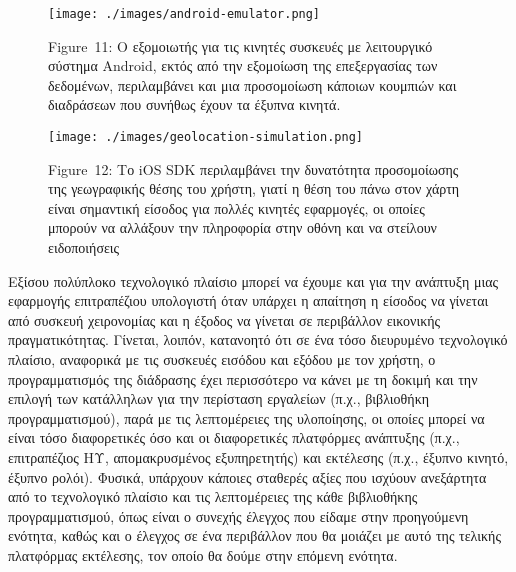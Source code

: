 \documentclass[
]{article}
\begin{document}
\leavevmode{}%
\begin{figure}
\hypertarget{fig:android-emulator}{%
\centering
\texttt{[image: ./images/android-emulator.png]}
\caption{Figure~11: Ο εξομοιωτής για τις κινητές συσκευές με λειτουργικό
σύστημα Android, εκτός από την εξομοίωση της επεξεργασίας των δεδομένων,
περιλαμβάνει και μια προσομοίωση κάποιων κουμπιών και διαδράσεων που
συνήθως έχουν τα έξυπνα κινητά.}\label{fig:android-emulator}
}
\end{figure}

\leavevmode{}%
\begin{figure}
\hypertarget{fig:geolocation-simulation}{%
\centering
\texttt{[image: ./images/geolocation-simulation.png]}
\caption{Figure~12: Το iOS SDK περιλαμβάνει την δυνατότητα προσομοίωσης
της γεωγραφικής θέσης του χρήστη, γιατί η θέση του πάνω στον χάρτη είναι
σημαντική είσοδος για πολλές κινητές εφαρμογές, οι οποίες μπορούν να
αλλάξουν την πληροφορία στην οθόνη και να στείλουν
ειδοποιήσεις}\label{fig:geolocation-simulation}
}
\end{figure}

Εξίσου πολύπλοκο τεχνολογικό πλαίσιο μπορεί να έχουμε και για την
ανάπτυξη μιας εφαρμογής επιτραπέζιου υπολογιστή όταν υπάρχει η απαίτηση
η είσοδος να γίνεται από συσκευή χειρονομίας και η έξοδος να γίνεται σε
περιβάλλον εικονικής πραγματικότητας. Γίνεται, λοιπόν, κατανοητό ότι σε
ένα τόσο διευρυμένο τεχνολογικό πλαίσιο, αναφορικά με τις συσκευές
εισόδου και εξόδου με τον χρήστη, ο προγραμματισμός της διάδρασης έχει
περισσότερο να κάνει με τη δοκιμή και την επιλογή των κατάλληλων για την
περίσταση εργαλείων (π.χ., βιβλιοθήκη προγραμματισμού), παρά με τις
λεπτομέρειες της υλοποίησης, οι οποίες μπορεί να είναι τόσο διαφορετικές
όσο και οι διαφορετικές πλατφόρμες ανάπτυξης (π.χ., επιτραπέζιος ΗΥ,
απομακρυσμένος εξυπηρετητής) και εκτέλεσης (π.χ., έξυπνο κινητό, έξυπνο
ρολόι). Φυσικά, υπάρχουν κάποιες σταθερές αξίες που ισχύουν ανεξάρτητα
από το τεχνολογικό πλαίσιο και τις λεπτομέρειες της κάθε βιβλιοθήκης
προγραμματισμού, όπως είναι ο συνεχής έλεγχος που είδαμε στην
προηγούμενη ενότητα, καθώς και ο έλεγχος σε ένα περιβάλλον που θα
μοιάζει με αυτό της τελικής πλατφόρμας εκτέλεσης, τον οποίο θα δούμε
στην επόμενη ενότητα.
\end{document}
